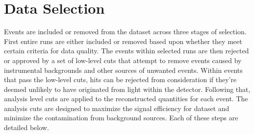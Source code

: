 %
%

\section{Data Selection}
\label{sec:data_selection}
Events are included or removed from the dataset across three stages of selection.
First entire runs are either included or removed based upon whether they meet
certain criteria for data quality.
The events within selected runs are then rejected or approved by a set
of low-level cuts that attempt to remove events caused by instrumental
backgrounds and other sources of unwanted events.
Within events that pass the low-level cuts, hits can be rejected from consideration
if they're deemed unlikely to have originated from light within the detector.
Following that, analysis level cuts are applied to the reconstructed quantities
for each event.
The analysis cuts are designed to maximize the signal efficiency for dataset and minimize the
contamination from background sources.
Each of these steps are detailed below.

